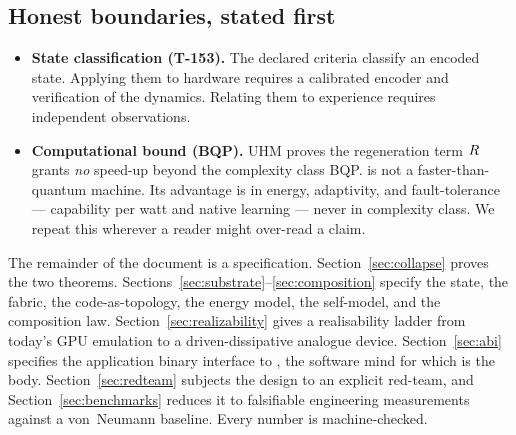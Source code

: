 \subsection{Honest boundaries, stated first}

\begin{itemize}[leftmargin=1.5em,itemsep=1pt]
  \item \textbf{State classification (T-153).} The declared criteria classify
        an encoded state. Applying them to hardware requires a calibrated
        encoder and verification of the dynamics. Relating them to experience
        requires independent observations.
  \item \textbf{Computational bound (BQP).} UHM proves the regeneration term
        $R$ grants \emph{no} speed-up beyond the complexity class BQP.
        \TALOS{} is not a faster-than-quantum machine. Its advantage is in
        energy, adaptivity, and fault-tolerance --- capability per watt and
        native learning --- never in complexity class. We repeat this wherever
        a reader might over-read a claim.
\end{itemize}

The remainder of the document is a specification. Section~\ref{sec:collapse}
proves the two theorems. Sections~\ref{sec:substrate}--\ref{sec:composition}
specify the state, the fabric, the code-as-topology, the energy model, the
self-model, and the composition law. Section~\ref{sec:realizability} gives a
realisability ladder from today's GPU emulation to a driven-dissipative
analogue device. Section~\ref{sec:abi} specifies the application binary
interface to \SYNARC{}, the software mind for which \TALOS{} is the body.
Section~\ref{sec:redteam} subjects the design to an explicit red-team, and
Section~\ref{sec:benchmarks} reduces it to falsifiable engineering
measurements against a von~Neumann baseline. Every number is machine-checked.
